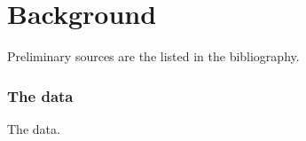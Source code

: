 \chapter{Background}
Preliminary sources are the listed in the bibliography. \cite{coates2011analysis} \cite{figueiredo2002unsupervised} \cite{hastie2009unsupervised} \cite{10.1007/978-3-319-24589-8_9}
\subsection{The data}
The data.
